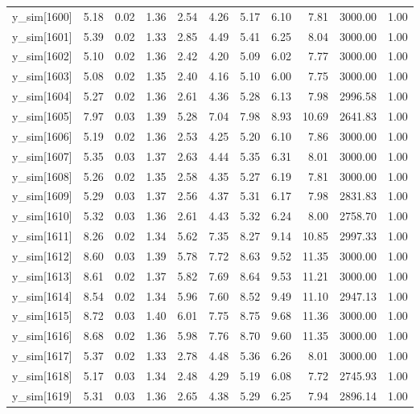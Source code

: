\begin{table}[ht]
\begin{tabular}{rrrrrrrrrrr}
  y\_sim[1600] & 5.18 & 0.02 & 1.36 & 2.54 & 4.26 & 5.17 & 6.10 & 7.81 & 3000.00 & 1.00 \\ 
  y\_sim[1601] & 5.39 & 0.02 & 1.33 & 2.85 & 4.49 & 5.41 & 6.25 & 8.04 & 3000.00 & 1.00 \\ 
  y\_sim[1602] & 5.10 & 0.02 & 1.36 & 2.42 & 4.20 & 5.09 & 6.02 & 7.77 & 3000.00 & 1.00 \\ 
  y\_sim[1603] & 5.08 & 0.02 & 1.35 & 2.40 & 4.16 & 5.10 & 6.00 & 7.75 & 3000.00 & 1.00 \\ 
  y\_sim[1604] & 5.27 & 0.02 & 1.36 & 2.61 & 4.36 & 5.28 & 6.13 & 7.98 & 2996.58 & 1.00 \\ 
  y\_sim[1605] & 7.97 & 0.03 & 1.39 & 5.28 & 7.04 & 7.98 & 8.93 & 10.69 & 2641.83 & 1.00 \\ 
  y\_sim[1606] & 5.19 & 0.02 & 1.36 & 2.53 & 4.25 & 5.20 & 6.10 & 7.86 & 3000.00 & 1.00 \\ 
  y\_sim[1607] & 5.35 & 0.03 & 1.37 & 2.63 & 4.44 & 5.35 & 6.31 & 8.01 & 3000.00 & 1.00 \\ 
  y\_sim[1608] & 5.26 & 0.02 & 1.35 & 2.58 & 4.35 & 5.27 & 6.19 & 7.81 & 3000.00 & 1.00 \\ 
  y\_sim[1609] & 5.29 & 0.03 & 1.37 & 2.56 & 4.37 & 5.31 & 6.17 & 7.98 & 2831.83 & 1.00 \\ 
  y\_sim[1610] & 5.32 & 0.03 & 1.36 & 2.61 & 4.43 & 5.32 & 6.24 & 8.00 & 2758.70 & 1.00 \\ 
  y\_sim[1611] & 8.26 & 0.02 & 1.34 & 5.62 & 7.35 & 8.27 & 9.14 & 10.85 & 2997.33 & 1.00 \\ 
  y\_sim[1612] & 8.60 & 0.03 & 1.39 & 5.78 & 7.72 & 8.63 & 9.52 & 11.35 & 3000.00 & 1.00 \\ 
  y\_sim[1613] & 8.61 & 0.02 & 1.37 & 5.82 & 7.69 & 8.64 & 9.53 & 11.21 & 3000.00 & 1.00 \\ 
  y\_sim[1614] & 8.54 & 0.02 & 1.34 & 5.96 & 7.60 & 8.52 & 9.49 & 11.10 & 2947.13 & 1.00 \\ 
  y\_sim[1615] & 8.72 & 0.03 & 1.40 & 6.01 & 7.75 & 8.75 & 9.68 & 11.36 & 3000.00 & 1.00 \\ 
  y\_sim[1616] & 8.68 & 0.02 & 1.36 & 5.98 & 7.76 & 8.70 & 9.60 & 11.35 & 3000.00 & 1.00 \\ 
  y\_sim[1617] & 5.37 & 0.02 & 1.33 & 2.78 & 4.48 & 5.36 & 6.26 & 8.01 & 3000.00 & 1.00 \\ 
  y\_sim[1618] & 5.17 & 0.03 & 1.34 & 2.48 & 4.29 & 5.19 & 6.08 & 7.72 & 2745.93 & 1.00 \\ 
  y\_sim[1619] & 5.31 & 0.03 & 1.36 & 2.65 & 4.38 & 5.29 & 6.25 & 7.94 & 2896.14 & 1.00 \\ 

\end{tabular}
\end{table}
